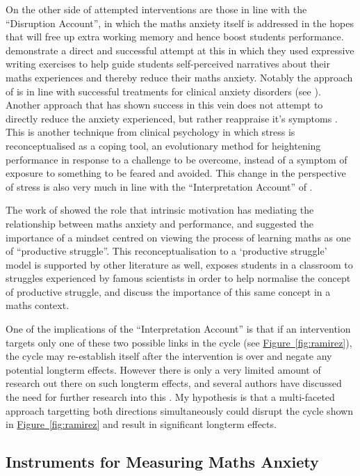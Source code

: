 \documentclass[twoside,12pt,a4paper]{report}
\newcommand{\reffig}[1]{\hyperref[fig:#1]{Figure~\ref{fig:#1}}}
\begin{document}
On the other side of attempted interventions are those in line with the ``Disruption Account'', in which the maths anxiety itself is addressed in the hopes that will free up extra working memory and hence boost students performance.   demonstrate a direct and successful attempt at this in which they used expressive writing exercises to help guide students self-perceived narratives about their maths experiences and thereby reduce their maths anxiety. Notably the approach of  is in line with successful treatments for clinical anxiety disorders (see ). Another approach that has shown success in this vein does not attempt to directly reduce the anxiety experienced, but rather reappraise it's symptoms \cite{Jamieson2016}. This is another technique from clinical psychology in which stress is reconceptualised as a coping tool, an evolutionary method for heightening performance in response to a challenge to be overcome, instead of a symptom of exposure to something to be feared and avoided. This change in the perspective of stress is also very much in line with the ``Interpretation Account'' of .

The work of  showed the role that intrinsic motivation has mediating the relationship between maths anxiety and performance, and suggested the importance of a mindset centred on viewing the process of learning maths as one of ``productive struggle''. This reconceptualisation to a `productive struggle' model is supported by other literature as well,  exposes students in a classroom to struggles experienced by famous scientists in order to help normalise the concept of productive struggle, and  discuss the importance of this same concept in a maths context.

One of the implications of the ``Interpretation Account'' is that if an intervention targets only one of these two possible links in the cycle (see \reffig{ramirez}), the cycle may re-establish itself after the intervention is over and negate any potential longterm effects. However there is only a very limited amount of research out there on such longterm effects, and several authors have discussed the need for further research into this \cite{Pellicioni2016,Chang2016}. My hypothesis is that a multi-faceted approach targetting both directions simultaneously could disrupt the cycle shown in \reffig{ramirez} and result in significant longterm effects.

\subsection*{Instruments for Measuring Maths Anxiety}
\end{document}
